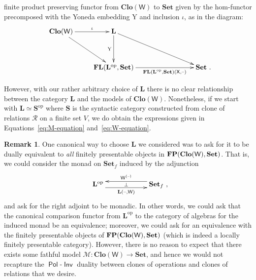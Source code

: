 \documentclass[11pt, a4paper, twoside,leqno]{amsart}
\newcommand{\cat}[1]{\mathbf{#1}}
\newcommand{\thg}{{\mathord{\text{--}}}}
\newcommand{\cd}[2][]{\vcenter{\hbox{\xymatrix#1{#2}}}}
\numberwithin{equation}{section}
\theoremstyle{plain}
\theoremstyle{definition}
\newtheorem{Rk}[Thm]{Remark}
\newcommand{\Set}{\cat{Set}}
\DeclareMathOperator{\FP}{\bf FP}
\DeclareMathOperator{\FL}{\bf FL}
\DeclareMathOperator{\Pol}{\mathsf{Pol}}
\DeclareMathOperator{\Inv}{\mathsf{Inv}}
\begin{document}
finite product preserving functor from \(\cat{Clo}(\mathsf{W})\) to
\(\Set\) given by the hom-functor precomposed with the Yoneda
embedding \(\mathrm{Y}
\) and inclusion \(\iota\), as in the diagram:
\begin{equation}
  \label{eq:cloW-arbitrary-L}
  \xymatrixrowsep{3pc}
  \cd{
    {\cat{Clo}(\mathsf{W})} \ar[r]^-{\iota} \ar[dr]_-{
    } & 
    {\cat{L}} \ar[d]_-{\mathrm{Y}
    } \ar[drrr]
    & \\
    & {\FL(\cat{L}^{\mathrm{op}},\Set)}
    \ar[rrr]_-{\FL(\cat{L}^{\mathrm{op}},\Set)(\mathsf{X}, \thg)      
    } &&& {\Set}\rlap{ .}
    }  
  \end{equation}

However, with our rather arbitrary choice of \(\cat{L}\) there is no clear relationship between the category \(\cat{L}\) and the models
of \(\cat{Clo}(\mathsf{W})\). Nonetheless, if we start with
\(\cat{L} \simeq \cat{S}^{\mathrm{op}}\)
where \(\cat{S}\) is the syntactic category constructed
from clone of relations \(\mathscr{R}\) on a finite set \(V\), we do
obtain the expressions given in Equations~\eqref{eq:M-equation} and~\eqref{eq:W-equation}.
\begin{Rk}
  \label{rk:fp-objects-models-cloW}
 One canonical way to choose \(\cat{L}\)
we considered was to ask for it to be dually equivalent to \emph{all} finitely presentable objects in
\(\FP(\cat{Clo}(\mathsf{W}),\Set)\). That is, we could consider the monad on
\(\cat{Set}_{f}\) induced by the adjunction
  \begin{equation}
    \label{eq:adj-arbitrary-L}
    \xymatrixcolsep{5pc}
    \xymatrixrowsep{3.5pc}
    \cd{
      {\cat{L}^{\mathrm{op}}} 
       \ar@<-4.5pt>[r]_-{\cat{L}(\thg,\mathsf{W})}
\ar@{<-}@<4.5pt>[r]^-{\mathsf{W}^{(\thg)}} \ar@{}[r]|-{\bot} &
{\Set_{f}}
\rlap{ ,}
    }
  \end{equation}
  and ask for the right adjoint to be monadic. In other words, we
  could ask that the canonical comparison functor from
  \(\cat{L}^{\mathrm{op}}\) to the category of algebras for the
  induced monad be an equivalence; moreover, we could ask for an
  equivalence with the finitely
  presentable objects of \(\FP(\cat{Clo}(\mathsf{W}),\Set)\) (which is
  indeed a locally finitely presentable category).
  However, there is no reason to expect
that there exists some
fathful model \(\mathcal{M} \colon \cat{Clo}(\mathsf{W}) \rightarrow
\Set\), and hence we would not recapture the 
\(\Pol\)-\(\Inv\) duality between clones of operations and clones of
relations that we desire.
\end{Rk}
\end{document}
